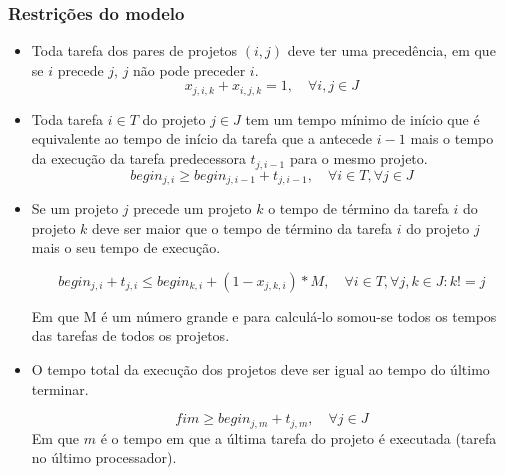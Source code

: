 \documentclass[11pt,letterpaper]{article}
\begin{document}
\subsubsection*{Restrições do modelo}
\begin{itemize}
\item Toda tarefa dos pares de projetos $(i,j)$ deve ter uma precedência, em que se $i$
  precede $j$, $j$ não pode preceder $i$. 
  \begin{equation*}
    x_{j,i,k}+x_{i,j,k}=1, \quad \forall i,j \in J
  \end{equation*}

\item Toda tarefa $i \in T$ do projeto  $j \in J$ tem um tempo mínimo de início que é equivalente ao tempo de início da tarefa que a antecede $i -1$ mais o tempo da execução da tarefa predecessora $ t_{j,i-1}$ para o mesmo projeto. 
  \begin{equation*}
    begin_{j,i} \geq begin_{j,i-1}+ t_{j,i-1}, \quad\forall i \in T, \forall j \in J
  \end{equation*}

\item Se um projeto $j$ precede um projeto $k$ o tempo de término da
  tarefa $i$ do projeto $k$ deve ser maior que o tempo de término da
  tarefa $i$ do projeto $j$ mais o seu tempo de execução.
  
  \begin{equation*}
    begin_{j,i} + t_{j,i} \leq begin_{k,i}+(1-x_{j,k,i})*M,\quad \forall i \in T, \forall j,k \in J  : k!=j 
  \end{equation*}


  Em que M é um número grande e para calculá-lo somou-se todos os tempos
  das tarefas de todos os projetos. 

  




\item O tempo total da execução dos projetos deve ser igual ao tempo
  do último terminar.
  
  \begin{equation*}
    fim \geq begin_{j,m}+ t_{j,m},\quad \forall j \in J
  \end{equation*}
  Em que $m$ é o tempo em que a última tarefa do projeto é executada
  (tarefa no último processador).
\end{itemize}
\end{document}
